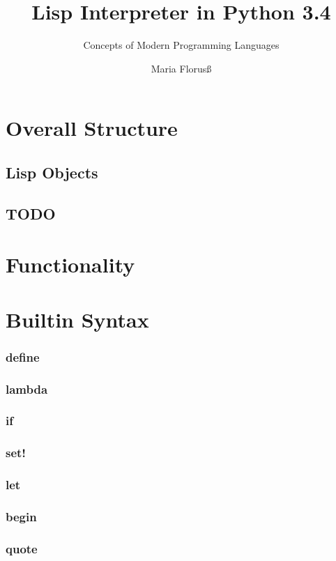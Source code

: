 \documentclass[12pt,a4paper]{scrartcl}
\begin{document}
\title{Lisp Interpreter in Python 3.4}
\subtitle{Concepts of Modern Programming Languages}
\author{Maria Florus\ss}
\maketitle
\newpage

\section*{Overall Structure}

\subsection*{Lisp Objects}
\subsection*{TODO}

\section*{Functionality}

\section*{Builtin Syntax}
\subsubsection*{define}
\subsubsection*{lambda}
\subsubsection*{if}
\subsubsection*{set!}
\subsubsection*{let}
\subsubsection*{begin}
\subsubsection*{quote}
\end{document}
